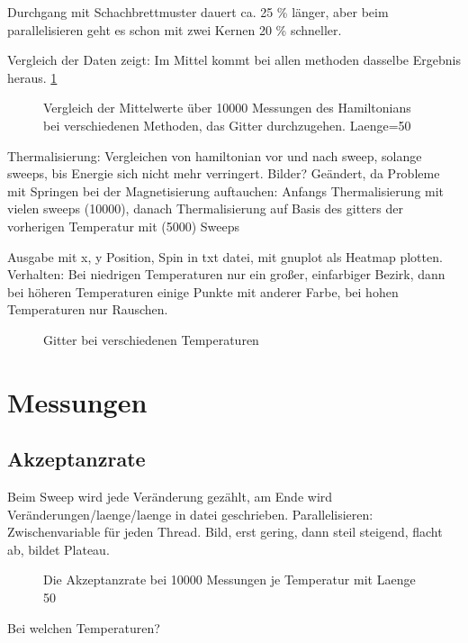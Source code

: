 \documentclass{scrreprt}
\begin{document}
	Durchgang mit Schachbrettmuster dauert ca. 25 \% länger, aber beim parallelisieren geht es schon mit zwei Kernen 20 \% schneller. 
	
	Vergleich der Daten zeigt: Im Mittel kommt bei allen methoden dasselbe Ergebnis heraus. \ref{fig:vergleichhamiltoniansweep}
	
	\begin{figure}[htbp]
	
	\label{fig:vergleichhamiltoniansweep}
		\caption{Vergleich der Mittelwerte über 10000 Messungen des Hamiltonians bei verschiedenen Methoden, das Gitter durchzugehen. Laenge=50}
	\end{figure}
	
	Thermalisierung: 
	Vergleichen von hamiltonian vor und nach sweep, solange sweeps, bis Energie sich nicht mehr verringert. Bilder?
	Geändert, da Probleme mit Springen bei der Magnetisierung auftauchen: Anfangs Thermalisierung mit vielen sweeps (10000), danach Thermalisierung auf Basis des gitters der vorherigen Temperatur mit (5000) Sweeps
	
	Ausgabe mit x, y Position, Spin in txt datei, mit gnuplot als Heatmap plotten.
	Verhalten: Bei niedrigen Temperaturen nur ein großer, einfarbiger Bezirk, dann bei höheren Temperaturen einige Punkte mit anderer Farbe, bei hohen Temperaturen nur Rauschen.
	
	\begin{figure}
	\begin{minipage}{0.48\textwidth}
		
	\end{minipage}
	\begin{minipage}{0.48\textwidth}
		
	\end{minipage}
	\begin{minipage}{0.48\textwidth}
		
	\end{minipage}
	\caption{Gitter bei verschiedenen Temperaturen}
	\label{fig:gitter}
	\end{figure}
	
	\section{Messungen}
	\subsection{Akzeptanzrate}
	Beim Sweep wird jede Veränderung gezählt, am Ende wird Veränderungen/laenge/laenge in datei geschrieben.
	Parallelisieren: Zwischenvariable für jeden Thread. Bild, erst gering, dann steil steigend, flacht ab, bildet Plateau.
	\begin{figure}
		
		\label{fig:akzeptanznaiv}
		\caption{Die Akzeptanzrate bei 10000 Messungen je Temperatur mit Laenge 50}
	\end{figure}
	Bei welchen Temperaturen?
\end{document}
